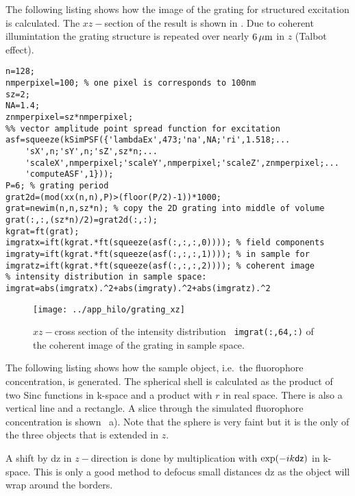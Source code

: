 The following listing shows how the image of the grating for
structured excitation is calculated. The $xz-$section of the result is
shown in . Due to coherent illumintation the
grating structure is repeated over nearly $\unit[6]{\mu m}$ in $z$
(Talbot effect).
\begin{lstlisting}
n=128;
nmperpixel=100; % one pixel is corresponds to 100nm
sz=2;
NA=1.4;
znmperpixel=sz*nmperpixel;
%% vector amplitude point spread function for excitation
asf=squeeze(kSimPSF({'lambdaEx',473;'na',NA;'ri',1.518;...
    'sX',n;'sY',n;'sZ',sz*n;...
    'scaleX',nmperpixel;'scaleY',nmperpixel;'scaleZ',znmperpixel;...
    'computeASF',1}));
P=6; % grating period
grat2d=(mod(xx(n,n),P)>(floor(P/2)-1))*1000;
grat=newim(n,n,sz*n); % copy the 2D grating into middle of volume
grat(:,:,(sz*n)/2)=grat2d(:,:);
kgrat=ft(grat);
imgratx=ift(kgrat.*ft(squeeze(asf(:,:,:,0)))); % field components
imgraty=ift(kgrat.*ft(squeeze(asf(:,:,:,1)))); % in sample for
imgratz=ift(kgrat.*ft(squeeze(asf(:,:,:,2)))); % coherent image
% intensity distribution in sample space:
imgrat=abs(imgratx).^2+abs(imgraty).^2+abs(imgratz).^2
\end{lstlisting}
\begin{figure}[htb]
  \centering
  \texttt{[image: ../app\_hilo/grating\_xz]}
  \caption{$xz-$cross section of the intensity distribution {\tt
      imgrat(:,64,:)} of the coherent image of the grating in sample
    space.}
  \label{fig:grating}
\end{figure}
The following listing shows how the sample object, i.e.\ the
fluorophore concentration, is generated.  The spherical shell is
calculated as the product of two Sinc functions in k-space and a
product with $r$ in real space. There is also a vertical line and a
rectangle. A slice through the simulated fluorophore concentration is
shown ~a). Note that the sphere is very faint but
it is the only of the three objects that is extended in $z$.

A shift by {\sf dz} in $z-$direction is done by multiplication with
$\exp(-ik{\sf dz})$ in k-space. This is only a good method to defocus
small distances {\sf dz} as the object will wrap around the borders.

